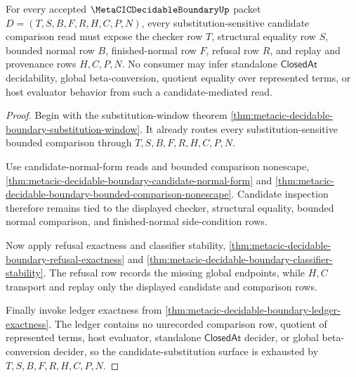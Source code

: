 \begin{theorem}
\label{thm:metacic-decidable-boundary-candidate-substitution-exhaustion}
For every accepted $\MetaCICDecidableBoundaryUp$ packet $D=(T,S,B,F,R,H,C,P,N)$, every substitution-sensitive candidate comparison read must expose the checker row $T$, structural equality row $S$, bounded normal row $B$, finished-normal row $F$, refusal row $R$, and replay and provenance rows $H,C,P,N$. No consumer may infer standalone $\mathsf{ClosedAt}$ decidability, global beta-conversion, quotient equality over represented terms, or host evaluator behavior from such a candidate-mediated read.
\end{theorem}
\begin{proof}
Begin with the substitution-window theorem \autoref{thm:metacic-decidable-boundary-substitution-window}. It already routes every substitution-sensitive bounded comparison through $T,S,B,F,R,H,C,P,N$.

Use candidate-normal-form reads and bounded comparison nonescape, \autoref{thm:metacic-decidable-boundary-candidate-normal-form} and \autoref{thm:metacic-decidable-boundary-bounded-comparison-nonescape}. Candidate inspection therefore remains tied to the displayed checker, structural equality, bounded normal comparison, and finished-normal side-condition rows.

Now apply refusal exactness and classifier stability, \autoref{thm:metacic-decidable-boundary-refusal-exactness} and \autoref{thm:metacic-decidable-boundary-classifier-stability}. The refusal row records the missing global endpoints, while $H,C$ transport and replay only the displayed candidate and comparison rows.

Finally invoke ledger exactness from \autoref{thm:metacic-decidable-boundary-ledger-exactness}. The ledger contains no unrecorded comparison row, quotient of represented terms, host evaluator, standalone $\mathsf{ClosedAt}$ decider, or global beta-conversion decider, so the candidate-substitution surface is exhausted by $T,S,B,F,R,H,C,P,N$.
\end{proof}

